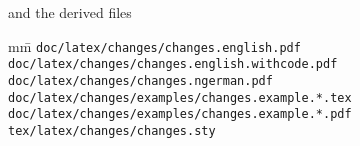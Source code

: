 and the derived files

\begin{tabbing}
	mm\=\kill
	\>\texttt{doc/latex/changes/changes.english.pdf}\\
	\>\texttt{doc/latex/changes/changes.english.withcode.pdf}\\
	\>\texttt{doc/latex/changes/changes.ngerman.pdf}\\

	\>\texttt{doc/latex/changes/examples/changes.example.*.tex}\\
	\>\texttt{doc/latex/changes/examples/changes.example.*.pdf}\\

	\>\texttt{tex/latex/changes/changes.sty}
\end{tabbing}


